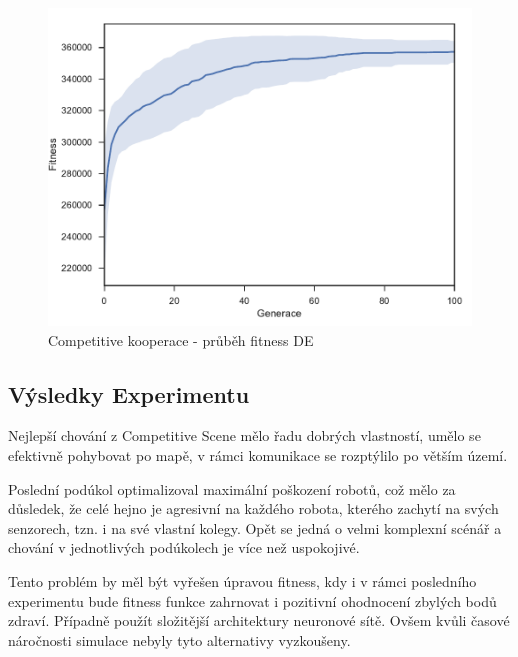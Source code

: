 \clearpage
\begin{figure}[h]\centering
	\includegraphics[width=\columnwidth]{../img/CompetitiveMap/CoopAgresive}
	\caption{Competitive kooperace - průběh fitness DE}
	\label{obr04:CompetitiveCoopAgresive}
\end{figure}
\newpage
\subsection*{Výsledky Experimentu}
 Nejlepší chování z Competitive Scene mělo řadu dobrých vlastností, umělo se efektivně pohybovat po mapě, v rámci komunikace se rozptýlilo po větším území. \par
 Poslední  podúkol optimalizoval maximální poškození robotů, což mělo za důsledek, že celé hejno je agresivní na každého robota, kterého zachytí na svých senzorech, tzn. i na své vlastní kolegy. Opět se jedná o velmi komplexní scénář a chování v jednotlivých podúkolech je více než uspokojivé.\par
Tento problém by měl být vyřešen úpravou fitness, kdy i v rámci posledního experimentu bude fitness funkce zahrnovat i pozitivní ohodnocení zbylých bodů zdraví. Případně použít složitější architektury neuronové sítě.  Ovšem kvůli časové náročnosti simulace nebyly tyto alternativy vyzkoušeny. 
\par
 
